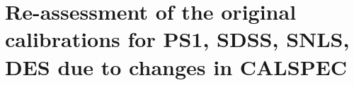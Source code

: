 \documentclass[twocolumn]{aastex63}
\begin{document}
\section{Re-assessment of the original calibrations for PS1, SDSS, SNLS, DES due to changes in CALSPEC}



\end{document}
